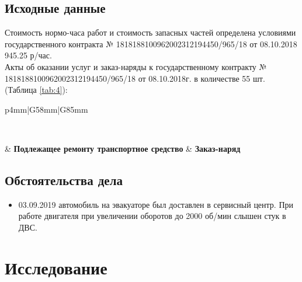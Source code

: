 \subsection{Исходные данные}

Стоимость  нормо-часа работ и стоимость запасных частей определена условиями государственного контракта  № 1818188100962002312194450/965/18 от 08.10.2018 945.25 р/час.\\
Акты об оказании услуг и заказ-наряды к государственному контракту № 1818188100962002312194450/965/18 от 08.10.2018г. в количестве 55 шт. (Таблица  \ref{tab:4}):\\

\begin{longtable}{p{4mm}|G{58mm}|G{85mm}} 
	\caption[]{Акты об оказании услуг и заказ-наряды на выполнение работ по ремонту транспортного средства}\label{tab:4}\\ 
	\hline\hline 
	
		 & \textbf{Подлежащее ремонту транспортное средство} &  \textbf{Заказ-наряд}\\ \hline\endhead
	
	
	
	
\end{longtable} \setcounter{rownum}{0}
	
%	

         
\subsection{Обстоятельства дела}
\begin{itemize}
\item 03.09.2019 автомобиль  на эвакуаторе был доставлен в сервисный центр. При работе двигателя при увеличении оборотов до 2000 об/мин слышен стук в ДВС. 
%
\end{itemize}
% 
%
%
\section{Исследование}

